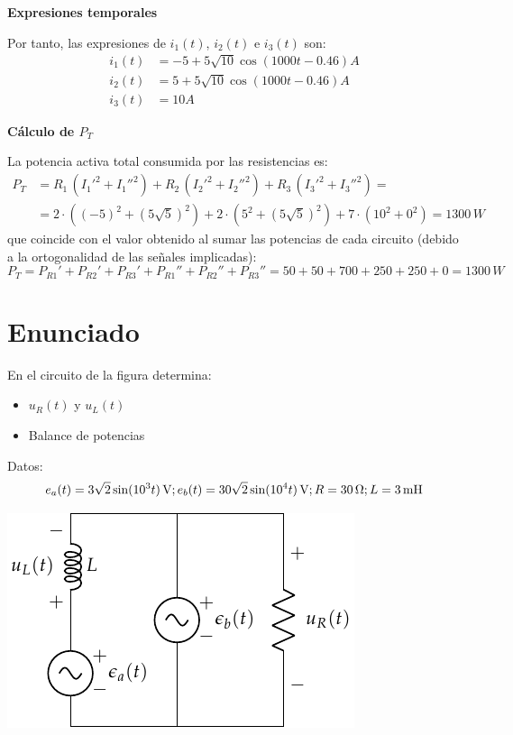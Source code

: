 \textbf{Expresiones temporales}
    
Por tanto, las expresiones de $i_1(t)$, $i_2(t)$ e $i_3(t)$ son:
\begin{align*}
  i_1(t)&= -5+5\sqrt{10}\cos(1000t-0.46) A \\
  i_2(t)&= 5+5\sqrt{10}\cos(1000t-0.46) A \\
  i_3(t)&= 10 A 
\end{align*}
    
\textbf{Cálculo de $P_T$}
    
La potencia activa total consumida por las resistencias es:
\begin{align*}
  P_T&=R_1\,(I_1'^2+I_1''^2)+R_2\,(I_2'^2+I_2''^2)+R_3\,(I_3'^2+I_3''^2)=\\
     &=2\cdot((-5)^2+(5\sqrt{5})^2)+2\cdot(5^2+(5\sqrt{5})^2)+7\cdot (10^2+0^2)={1300\,W}
\end{align*}
que coincide con el valor obtenido al sumar las potencias de cada
circuito (debido a la ortogonalidad de las señales implicadas):
\begin{equation*}
  P_T=P_{R1}'+P_{R2}'+P_{R3}'+P_{R1}''+P_{R2}''+P_{R3}''=50+50+700+250+250+0=1300\,W
\end{equation*}


\section{Enunciado}
En el circuito de la figura determina:
\begin{itemize}
\item $u_R(t)$ y $u_L(t)$
\item Balance de potencias
\end{itemize}
Datos:
\begin{equation*}
  e_a(t) = \qty[parse-numbers=false]{3\sqrt{2} \sin(10^3 t)}{\volt}; e_b(t) = \qty[parse-numbers=false]{30\sqrt{2} \sin(10^4 t)}{\volt}; R = \qty{30}{\ohm}; L = \qty{3}{\milli\henry} 
\end{equation*}

\begin{center}
  \includegraphics{figuras/superposicion2_ej.pdf}
\end{center}

